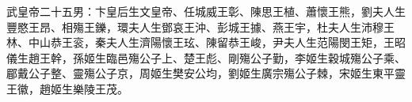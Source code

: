 
\begin{pinyinscope}
武皇帝二十五男：卞皇后生文皇帝、任城威王彰、陳思王植、蕭懷王熊，劉夫人生豐愍王昂、相殤王鑠，環夫人生鄧哀王沖、彭城王據、燕王宇，杜夫人生沛穆王林、中山恭王衮，秦夫人生濟陽懷王玹、陳留恭王峻，尹夫人生范陽閔王矩，王昭儀生趙王幹，孫姬生臨邑殤公子上、楚王彪、剛殤公子勤，李姬生穀城殤公子乘、郿戴公子整、靈殤公子京，周姬生樊安公均，劉姬生廣宗殤公子棘，宋姬生東平靈王徽，趙姬生樂陵王茂。


\end{pinyinscope}
